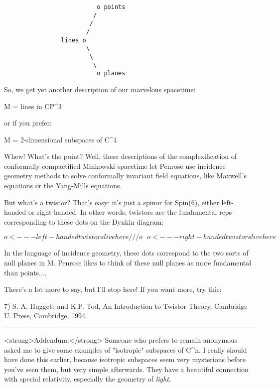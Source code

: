 \begin{verbatim}
                          o points
                         /
                        /
                       /
                lines o 
                       \
                        \
                         \
                          o planes

\end{verbatim}
    
So, we get yet another description of our marvelous spacetime:

M = {lines in CP^{3}}

or if you prefer:

M = {2-dimensional subspaces of C^{4}}

Whew!  What's the point?  Well, these descriptions of the
complexification of conformally compactified Minkowski spacetime let
Penrose use incidence geometry methods to solve conformally invariant
field equations, like Maxwell's equations or the Yang-Mills equations.

But what's a twistor?  That's easy: it's just a spinor for Spin(6),
either left-handed or right-handed.  In other words, twistors are
the fundamental reps corresponding to these dots on the Dynkin
diagram:

$$
                          o <--- left-handed twistors live here
                         /
                        /
                       /
                      o
                       \
                        \
                         \
                          o <--- right-handed twistors live here
$$
    
In the language of incidence geometry, these dots correspond to the two
sorts of null planes in M.  Penrose likes to think of these null planes
as more fundamental than points....

There's a lot more to say, but I'll stop here!  If you want more,
try this:

7) S. A. Huggett and K.P. Tod, An Introduction to Twistor Theory,
Cambridge U. Press, Cambridge, 1994.

\par\noindent\rule{\textwidth}{0.4pt}
<strong>Addendum:</strong> 
Someone who prefers to remain anonymous asked me to give some examples
of "isotropic" subspaces of C^{n}.  I really should have done this
earlier, because isotropic subspaces seem very mysterious before you've
seen them, but very simple afterwards.  They have a beautiful connection
with special relativity, especially the geometry of \emph{light}.


